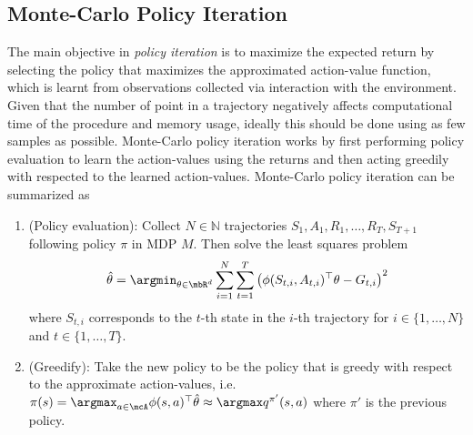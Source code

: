 \subsection{Monte-Carlo Policy Iteration} The main objective in \textit{policy iteration} is to maximize the expected return by selecting the policy that maximizes the approximated action-value function, which is learnt from observations collected via interaction with the environment. Given that the number of point in a trajectory negatively affects computational time of the procedure and memory usage, ideally this should be done using as few samples as possible. Monte-Carlo policy iteration works by first performing policy evaluation to learn the action-values using the returns and then acting greedily with respected to the learned action-values. Monte-Carlo policy iteration can be summarized as 
\begin{enumerate}
    \item (Policy evaluation): Collect $N \in \mathbb{N}$ trajectories $S_{1},A_1,R_1,\dotsc,R_T,S_{T+1}$ following policy $\pi$ in MDP $M$. Then solve the least squares problem 
    \begin{align*}
        \hat\theta = \argmin_{\theta \in \mbR^d} \sum_{i=1}^N\sum_{t=1}^T \left(\phi(S_{t,i},A_{t,i})^\top \theta - G_{t,i}\right)^2
    \end{align*}
    where $S_{t,i}$ corresponds to the $t$-th state in the $i$-th trajectory for $i \in \{1,\dotsc,N\}$ and $t \in \{1,\dotsc,T\}$.
    \item (Greedify): Take the new policy to be the policy that is greedy with respect to the approximate action-values, i.e. $\pi(s) = \argmax_{a \in \mcA} \phi(s,a)^\top \hat\theta \approx \argmax q^{\pi'}(s,a)$ where $\pi'$ is the previous policy.
\end{enumerate}
